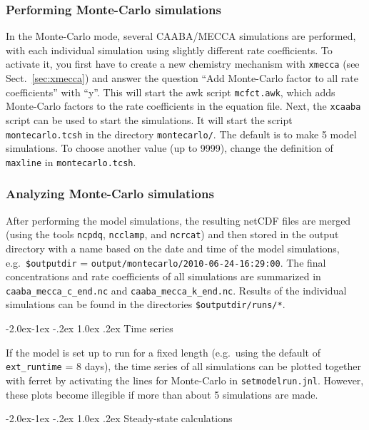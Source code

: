\documentclass[twoside]{article}
\makeatletter
\renewcommand\paragraph{\@startsection{paragraph}{4}{\z@}%
  {-2.0ex\@plus -1ex \@minus -.2ex}%
  {1.0ex \@plus .2ex}%
  {\normalfont\normalsize\bfseries}}
\makeatother
\begin{document}
\subsubsection{Performing Monte-Carlo simulations}

In the Monte-Carlo mode, several CAABA/MECCA simulations are performed,
with each individual simulation using slightly different rate
coefficients. To activate it, you first have to create a new chemistry
mechanism with \verb|xmecca| (see Sect.~\ref{sec:xmecca}) and answer the
question ``Add Monte-Carlo factor to all rate coefficients'' with ``y''.
This will start the awk script \verb|mcfct.awk|, which adds Monte-Carlo
factors to the rate coefficients in the equation file. Next, the
\verb|xcaaba| script can be used to start the simulations. It will start
the script \verb|montecarlo.tcsh| in the directory \verb|montecarlo/|.
The default is to make 5 model simulations. To choose another value (up
to 9999), change the definition of \verb|maxline| in
\verb|montecarlo.tcsh|.

\subsubsection{Analyzing Monte-Carlo simulations}

After performing the model simulations, the resulting netCDF files are
merged (using the tools \verb|ncpdq|, \verb|ncclamp|, and \verb|ncrcat|)
and then stored in the output directory with a name based on the date
and time of the model simulations, e.g.\ \verb|$outputdir| =
\verb|output/montecarlo/2010-06-24-16:29:00|. The final concentrations
and rate coefficients of all simulations are summarized in
\verb|caaba_mecca_c_end.nc| and \verb|caaba_mecca_k_end.nc|. Results of
the individual simulations can be found in the directories
\verb|$outputdir/runs/*|.

\paragraph{Time series}

If the model is set up to run for a fixed length (e.g.\ using the
default of \verb|ext_runtime| = 8 days), the time series of all
simulations can be plotted together with ferret by activating the lines
for Monte-Carlo in \verb|setmodelrun.jnl|. However, these plots become
illegible if more than about 5 simulations are made.

\paragraph{Steady-state calculations}
\end{document}
